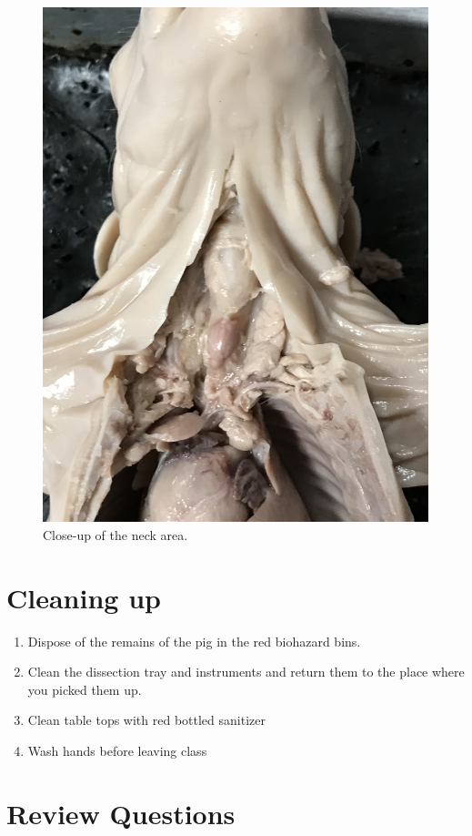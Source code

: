 \begin{figure}

{\centering \includegraphics[width=0.7\linewidth]{./figures/pig/pig_neck}

}

\caption{Close-up of the neck area.}\label{fig:neck}
\end{figure}

\section{Cleaning up}\label{cleaning-up-3}

\begin{enumerate}
\def\labelenumi{\arabic{enumi}.}
\tightlist
\item
  Dispose of the remains of the pig in the red biohazard bins.
\item
  Clean the dissection tray and instruments and return them to the place
  where you picked them up.
\item
  Clean table tops with red bottled sanitizer
\item
  Wash hands before leaving class
\end{enumerate}

\section{Review Questions}\label{review-questions-8}

